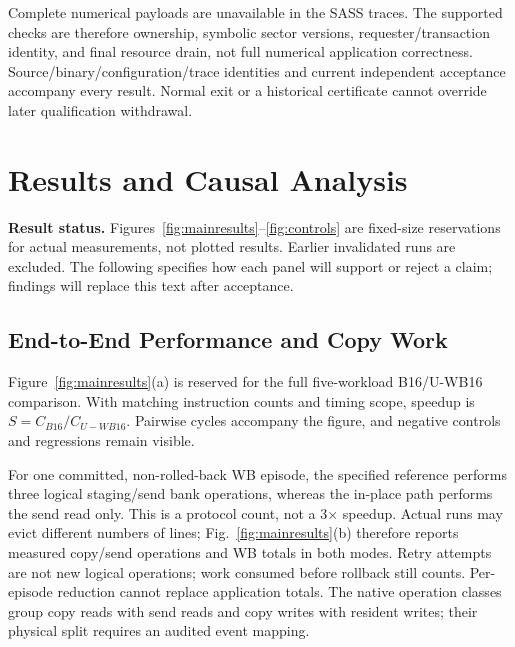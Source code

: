 \documentclass[conference,letterpaper]{IEEEtran}
\newcommand{\base}{B16}
\newcommand{\unif}{U-WB16}
\begin{document}
Complete numerical payloads are unavailable in the SASS traces. The supported checks are therefore ownership, symbolic sector versions, requester/transaction identity, and final resource drain, not full numerical application correctness. Source/binary/configuration/trace identities and current independent acceptance accompany every result. Normal exit or a historical certificate cannot override later qualification withdrawal.

\section{Results and Causal Analysis}
\noindent\textbf{Result status.}  Figures~\ref{fig:mainresults}--\ref{fig:controls} are fixed-size reservations for actual measurements, not plotted results. Earlier invalidated runs are excluded. The following specifies how each panel will support or reject a claim; findings will replace this text after acceptance.

\subsection{End-to-End Performance and Copy Work}
Figure~\ref{fig:mainresults}(a) is reserved for the full five-workload \base{}/\unif{} comparison. With matching instruction counts and timing scope, speedup is $S=C_{\base}/C_{\unif}$. Pairwise cycles accompany the figure, and negative controls and regressions remain visible.

For one committed, non-rolled-back WB episode, the specified reference performs three logical staging/send bank operations, whereas the in-place path performs the send read only. This is a protocol count, not a 3$\times$ speedup. Actual runs may evict different numbers of lines; Fig.~\ref{fig:mainresults}(b) therefore reports measured copy/send operations and WB totals in both modes. Retry attempts are not new logical operations; work consumed before rollback still counts. Per-episode reduction cannot replace application totals. The native operation classes group copy reads with send reads and copy writes with resident writes; their physical split requires an audited event mapping.
\end{document}

